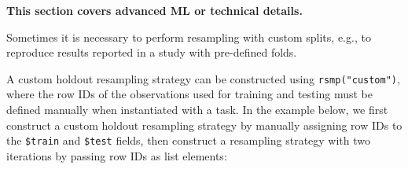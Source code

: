 \begin{tcolorbox}[enhanced jigsaw, colframe=quarto-callout-note-color-frame, rightrule=.15mm, bottomrule=.15mm, toprule=.15mm, opacityback=0, colback=white, left=2mm, arc=.35mm, breakable, leftrule=.75mm]
\begin{minipage}[t]{5.5mm}
\textcolor{quarto-callout-note-color}{\faInfo}
\end{minipage}%
\begin{minipage}[t]{\textwidth - 5.5mm}

\textbf{This section covers advanced ML or technical
details.}\vspace{2mm}

\end{minipage}%
\end{tcolorbox}

Sometimes it is necessary to perform resampling with custom splits,
e.g., to reproduce results reported in a study with pre-defined folds.

A custom holdout resampling strategy can be constructed using
\texttt{rsmp("custom")}, where the row IDs of the observations used for
training and testing must be defined manually when instantiated with a
task. In the example below, we first construct a custom holdout
resampling strategy by manually assigning row IDs to the
\texttt{\$train} and \texttt{\$test} fields, then construct a resampling
strategy with two iterations by passing row IDs as list elements:

\begin{Shaded}
\begin{Highlighting}[]
\OtherTok{=} \NormalTok{(}\NormalTok{)}

\OtherTok{=} \NormalTok{(}\SpecialCharTok{:}\NormalTok{, }\SpecialCharTok{:}\NormalTok{, }\SpecialCharTok{:}\NormalTok{)}
\SpecialCharTok{$}
   \SpecialCharTok{+} \NormalTok{),}
   \SpecialCharTok{+} \SpecialCharTok{+} \NormalTok{)}
\NormalTok{)}
\SpecialCharTok{$}\NormalTok{()}
\end{Highlighting}
\end{Shaded}

